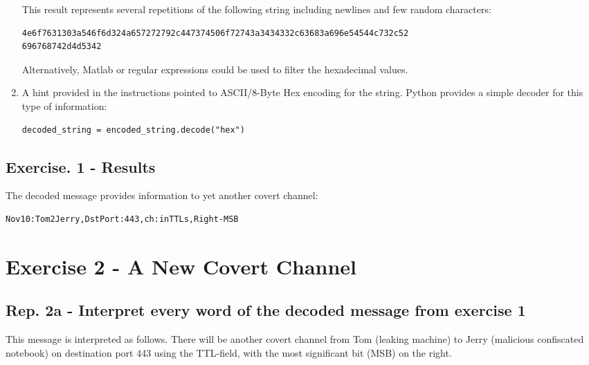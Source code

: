 \documentclass{article}
\begin{document}
\begin{enumerate}
This result represents several repetitions of the following string including newlines and few random characters:

\begin{verbatim}
4e6f7631303a546f6d324a657272792c447374506f72743a3434332c63683a696e54544c732c52
696768742d4d5342
\end{verbatim}

Alternatively, Matlab or regular expressions could be used to filter the hexadecimal values.

\item A hint provided in the instructions pointed to ASCII/8-Byte Hex encoding for the string. Python provides a simple decoder for this type of information:

\begin{verbatim}
decoded_string = encoded_string.decode("hex")
\end{verbatim}
\end{enumerate}

\subsection*{Exercise. 1 - Results}
The decoded message provides information to yet another covert channel:
\begin{verbatim}
Nov10:Tom2Jerry,DstPort:443,ch:inTTLs,Right-MSB
\end{verbatim}





\newpage
\section*{Exercise 2 - A New Covert Channel}

\subsection*{Rep. 2a - Interpret every word of the decoded message from exercise 1}
This message is interpreted as follows. There will be another covert channel from Tom (leaking machine) to Jerry (malicious confiscated notebook) on destination port 443 using the TTL-field, with the most significant bit (MSB) on the right. 
\end{document}
